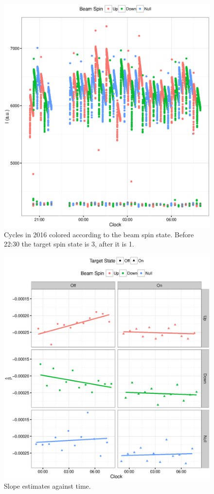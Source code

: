 \documentclass{report}
\begin{document}
\begin{figure}[H]
	\centering
	\includegraphics{Cycles2016.eps}
	\caption{Cycles in 2016 colored according to the beam spin state. Before 22:30 the target spin state is 3, after it is 1.\label{fig:Cycles}}
\end{figure}
\begin{figure}[H]
	\centering
	\includegraphics{Slopes2016_VS_Clock.eps}
	\caption{Slope estimates against time.\label{fig:Slopes}}
\end{figure}	
	
\end{document}
